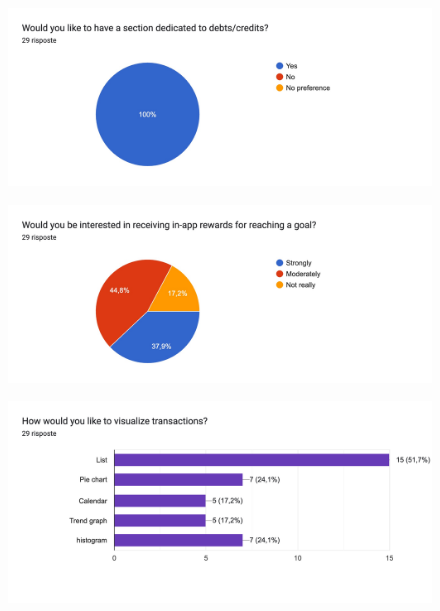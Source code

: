 \documentclass[a4paper,12pt]{article}
\begin{document}
\begin{figure}[H]
    \centering
    \includegraphics[width=\linewidth]{imagequest5.jpg}
\end{figure}

\begin{figure}[H]
    \centering
    \includegraphics[width=\linewidth]{imagequest6.jpg}
\end{figure}

\begin{figure}[H]
    \centering
    \includegraphics[width=\linewidth]{imagequest7.jpg}
\end{figure}
\end{document}
